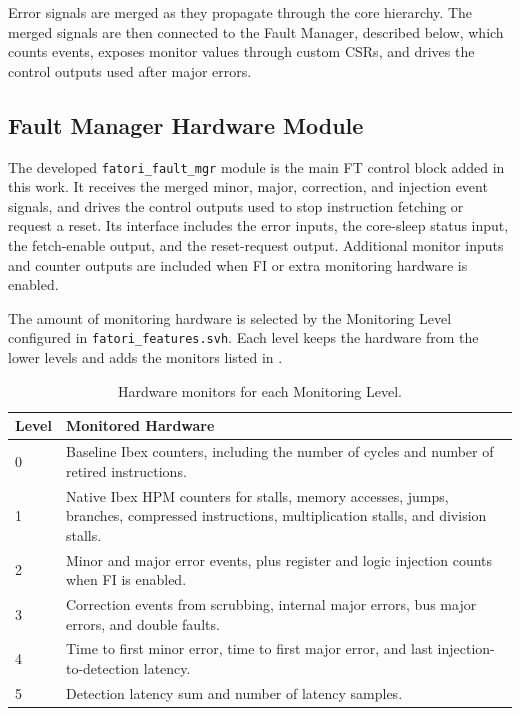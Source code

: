 Error signals are merged as they propagate through the core hierarchy. The merged signals are then connected to the Fault Manager, described below, which counts events, exposes monitor values through custom \acp{CSR}, and drives the control outputs used after major errors.




\subsection{Fault Manager Hardware Module}
\label{chap6:fault_mgr}

The developed \texttt{fatori\_fault\_mgr} module is the main \ac{FT} control block added in this work. It receives the merged minor, major, correction, and injection event signals, and drives the control outputs used to stop instruction fetching or request a reset. Its interface includes the error inputs, the core-sleep status input, the fetch-enable output, and the reset-request output. Additional monitor inputs and counter outputs are included when \ac{FI} or extra monitoring hardware is enabled.

The amount of monitoring hardware is selected by the Monitoring Level configured in \texttt{fatori\_features.svh}. Each level keeps the hardware from the lower levels and adds the monitors listed in .

\begin{table}[h]
\centering
\small
\setlength{\tabcolsep}{3.2pt}
\renewcommand{\arraystretch}{1.20}
\begin{tabularx}{\textwidth}{|p{}|X|}
\hline
\rowcolor{tableheader}\textbf{Level} &
\textbf{Monitored Hardware} \\
\hline
\hline
0 &
Baseline Ibex counters, including the number of cycles and number of retired instructions. \\
\hline
1 &
Native Ibex \ac{HPM} counters for stalls, memory accesses, jumps, branches, compressed instructions, multiplication stalls, and division stalls. \\
\hline
2 &
Minor and major error events, plus register and logic injection counts when \ac{FI} is enabled. \\
\hline
3 &
Correction events from scrubbing, internal major errors, bus major errors, and double faults. \\
\hline
4 &
Time to first minor error, time to first major error, and last injection-to-detection latency. \\
\hline
5 &
Detection latency sum and number of latency samples. \\
\hline
\end{tabularx}
\caption{Hardware monitors for each Monitoring Level.}
\label{tab:fatori_metric_levels}
\end{table}

